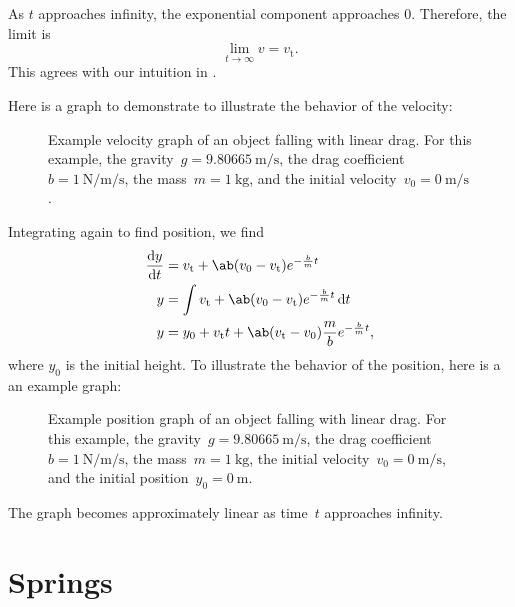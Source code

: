 As \(t\) approaches infinity, the exponential component approaches 0.
Therefore, the limit is
\begin{equation*}
    \lim_{t \to \infty} v = v_\mathrm{t}.
\end{equation*}
This agrees with our intuition in .

Here is a graph to demonstrate to illustrate the behavior of the velocity:
\begin{figure}[ht]
    \centering
    \resizebox{\textwidth}{!}{}
    \caption{
        Example velocity graph of an object falling with linear drag.
        For this example,
        the gravity~\(g = \qty{9.80665}{\metre \per \second}\),
        the drag coefficient~\(b = \qty{1}{\newton \per \metre \per \second}\),
        the mass~\(m = \qty{1}{\kilogram}\),
        and the initial velocity~\(v_0 = \qty{0}{\metre \per \second}\).
    }
\end{figure}

Integrating again to find position, we find
\begin{equation}
    \begin{aligned}
        \odv{y}{t} &= v_\mathrm{t} + \ab(v_0 - v_\mathrm{t}) e^{-
        \frac{b}{m} t} \\
        y &= \int v_\mathrm{t} + \ab(v_0 - v_\mathrm{t}) e^{-
        \frac{b}{m} t} \odif{t} \\
        y &= y_0
        + v_\mathrm{t} t
        + \ab(v_\mathrm{t} - v_0)
        \frac{m}{b}
        e^{- \frac{b}{m} t},
    \end{aligned}
\end{equation}
where \(y_0\) is the initial height.
To illustrate the behavior of the position, here is a an example graph:
\begin{figure}[ht]
    \centering
    \resizebox{\textwidth}{!}{}
    \caption{
        Example position graph of an object falling with linear drag.
        For this example,
        the gravity~\(g = \qty{9.80665}{\metre \per \second}\),
        the drag coefficient~\(b = \qty{1}{\newton \per \metre \per \second}\),
        the mass~\(m = \qty{1}{\kilogram}\),
        the initial velocity~\(v_0 = \qty{0}{\metre \per \second}\),
        and the initial position~\(y_0 = \qty{0}{\metre}\).
    }
\end{figure}
The graph becomes approximately linear as time~\(t\) approaches infinity.

\section{Springs}

